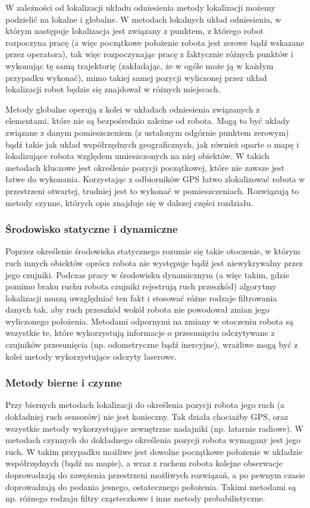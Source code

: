 W zależności od lokalizacji układu odniesienia metody lokalizacji możemy
podzielić na lokalne i globalne. W metodach lokalnych układ odniesienia, w
którym następuje lokalizacja jest związany z punktem, z którego robot rozpoczyna
pracę (a więc początkowe położenie robota jest zerowe bądź wskazane przez
operatora), tak więc rozpoczynając pracę z faktycznie różnych punktów i
wykonując tę samą trajektorię (zakładając, że w ogóle może ją w każdym
przypadku wykonać), mimo takiej samej pozycji wyliczonej przez układ
lokalizacji robot będzie się znajdował w różnych miejscach.

Metody globalne operują z kolei w układach odniesienia związanych z elementami,
które nie są bezpośrednio zależne od robota. Mogą to być układy związane z danym
pomieszczeniem (z ustalonym odgórnie punktem zerowym) bądź takie jak układ
współrzędnych geograficznych, jak również oparte o mapę i lokalizujące robota
względem umieszczonych na niej obiektów. W takich metodach kluczowe jest
określenie pozycji początkowej, które nie zawsze jest łatwe do wykonania.
Korzystając z odbiorników GPS łatwo zlokalizować robota w przestrzeni otwartej,
trudniej jest to wykonać w pomieszczeniach. Rozwiązują to metody czynne, których
opis znajduje się w dalszej części rozdziału.

\subsubsection{Środowisko statyczne i  dynamiczne}

Poprzez określenie środowiska statycznego rozumie się takie otoczenie, w którym
ruch innych obiektów oprócz robota nie występuje bądź jest niewykrywalny przez
jego czujniki. Podczas pracy w środowisku dynamicznym (a więc takim, gdzie
pomimo braku ruchu robota czujniki rejestrują ruch przeszkód) algorytmy
lokalizacji muszą uwzględniać ten fakt i stosować różne rodzaje filtrowania
danych tak, aby ruch przeszkód wokół robota nie powodował zmian jego wyliczonego
położenia. Metodami odpornymi na zmiany w otoczeniu robota są wszystkie te,
które wykorzystują informacje o przesunięciu odczytywane z czujników
przesunięcia (np. odometryczne bądź inercyjne), wrażliwe mogą być z kolei metody
wykorzystujące odczyty laserowe.

\subsubsection{Metody bierne i czynne}

Przy biernych metodach lokalizacji do określenia pozycji robota jego ruch
(a dokładniej ruch sensorów) nie jest konieczny. Tak działa chociażby GPS, oraz
wszystkie metody wykorzystujące zewnętrzne nadajniki (np. latarnie radiowe). W
metodach czynnych do dokładnego określenia pozycji robota wymagany jest jego
ruch. W takim przypadku możliwe jest dowolne początkowe położenie w układzie
współrzędnych (bądź na mapie), a wraz z ruchem robota kolejne obserwacje
doprowadzają do zawężenia przestrzeni możliwych rozwiązań, a po pewnym czasie
doprowadzają do podania jesnego, ostatecznego położenia. Takimi metodami są np.
różnego rodzaju filtry cząsteczkowe i inne metody probabilistyczne.


